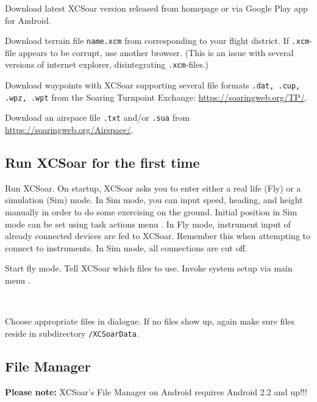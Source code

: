 \documentclass[english,a4paper,12pt]{refrep}
\renewcommand{\config}[3]{\bmenut{Config}{#1/3}{\LARGE$\triangleright$}~\bmenut{#2}{#3}}%
\begin{document}
\begin{compactitem}
\item[1.] Download latest XCSoar version released from homepage 
{\xcsoarwebsite{}} or via Google Play app for Android.
\item[2.] Download terrain file \texttt{name.xcm} from 
{}
corresponding to your flight district.  If \texttt{.xcm}-file appears to be 
corrupt, use another browser. (This is an issue with several versions of 
internet explorer, disintegrating \texttt{.xcm}-files.)
\item[3.] Download waypoints with XCSoar supporting several file formats 
\texttt{.dat, .cup, .wpz, .wpt} from the Soaring Turnpoint Exchange:
{\url{https://soaringweb.org/TP/}}.
\item[4.] Download an airspace file \texttt{.txt} and/or \texttt{.sua} from
{\url{https://soaringweb.org/Airspace/}}.
\end{compactitem}

\subsection{\textcolor{flashblue}{Run XCSoar for the first time}}
Run XCSoar. On startup, XCSoar asks you to enter either a real life (Fly) or
a simulation (Sim) mode. In Sim mode, you can input speed, heading, and height 
manually in order to do some exercising on the ground. Initial position in Sim mode
can be set using task actions menu .
In Fly mode, instrument input of already connected devices are fed to XCSoar.
Remember this when  attempting to connect to instruments. In Sim mode, all 
connections are cut off.

Start fly mode. Tell XCSoar which files to use. Invoke system setup via main 
menu .

\begin{flushleft}\hspace*{1cm}\config{2}{System}{}\blink{}
\blink{}\\\end{flushleft}

Choose appropriate files in dialogue. If no files show up, again make sure files 
reside in subdirectory \texttt{/XCSoarData}.

\subsection{\textcolor{flashblue}{File Manager}}
\textbf{Please note:} XCSoar's File Manager on Android requires Android 2.2
and up!!!
\end{document}
